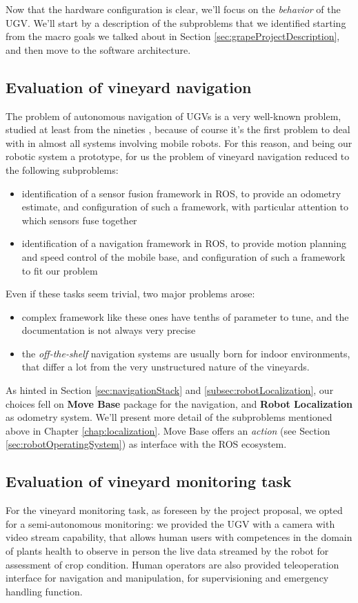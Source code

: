 Now that the hardware configuration is clear, we'll focus on the \textit{behavior} of the \ac{UGV}. We'll start by a description of the subproblems that we identified starting from the macro goals we talked about in Section \ref{sec:grapeProjectDescription}, and then move to the software architecture. \\

\subsection{Evaluation of vineyard navigation}
The problem of autonomous navigation of \ac{UGV}s is a very well-known problem, studied at least from the nineties \parencite{storiaUGV}, because of course it's the first problem to deal with in almost all systems involving mobile robots. For this reason, and being our robotic system a prototype, for us the problem of vineyard navigation reduced to the following subproblems:
\begin{itemize}
	\item identification of a sensor fusion framework in \ac{ROS}, to provide an odometry estimate, and configuration of such a framework, with particular attention to which sensors fuse together
	\item identification of a navigation framework in \ac{ROS}, to provide motion planning and speed control of the mobile base, and configuration of such a framework to fit our problem
\end{itemize}
Even if these tasks seem trivial, two major problems arose:
\begin{itemize}
	\item complex framework like these ones have tenths of parameter to tune, and the documentation is not always very precise
	\item the \textit{off-the-shelf} navigation systems are usually born for indoor environments, that differ a lot from the very unstructured nature of the vineyards.
\end{itemize}

As hinted in Section \ref{sec:navigationStack} and \ref{subsec:robotLocalization}, our choices fell on \textbf{Move Base} package for the navigation, and \textbf{Robot Localization} as odometry system. We'll present more detail of the subproblems mentioned above in Chapter \ref{chap:localization}. Move Base offers an \textit{action} (see Section \ref{sec:robotOperatingSystem}) as interface with the \ac{ROS} ecosystem.

\subsection{Evaluation of vineyard monitoring task}
For the vineyard monitoring task, as foreseen by the project proposal, we opted for a semi-autonomous monitoring: we provided the \ac{UGV} with a camera with video stream capability, that allows human users with competences in the domain of plants health to observe in person the live data streamed by the robot for assessment of crop condition. Human operators are also provided teleoperation interface for navigation and manipulation, for supervisioning and emergency handling function.


